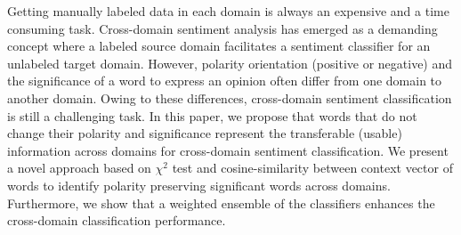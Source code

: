 Getting manually labeled data in each domain is always an expensive and a time consuming task. Cross-domain sentiment analysis has emerged as a demanding concept where a labeled source domain facilitates a sentiment classifier for an unlabeled target domain. However, polarity orientation (positive or negative) and the significance of a word to express an opinion often differ from one domain to another domain. Owing to these differences, cross-domain sentiment classification is still a challenging task. In this paper, we propose that words that do not change their polarity and significance represent the transferable (usable) information across domains for cross-domain sentiment classification. We present a novel approach based on $\chi^2$ test and cosine-similarity between context vector of words to identify polarity preserving significant words across domains. Furthermore, we show that a weighted ensemble of the classifiers enhances the cross-domain classification performance.
